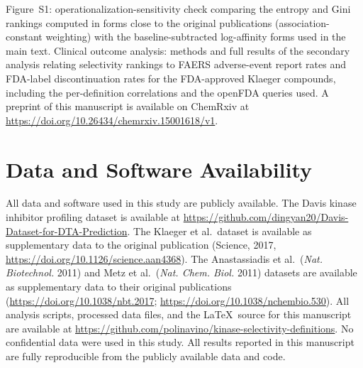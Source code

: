 \documentclass[journal=jcisd8,manuscript=article]{achemso}
\begin{document}
\begin{suppinfo}
Figure~S1: operationalization-sensitivity check comparing the entropy and Gini
rankings computed in forms close to the original publications
(association-constant weighting) with the baseline-subtracted log-affinity forms
used in the main text.
Clinical outcome analysis: methods and full results of the secondary analysis
relating selectivity rankings to FAERS adverse-event report rates and FDA-label
discontinuation rates for the FDA-approved Klaeger compounds, including the
per-definition correlations and the openFDA queries used.
A preprint of this manuscript is available on ChemRxiv at
\url{https://doi.org/10.26434/chemrxiv.15001618/v1}.
\end{suppinfo}

\section*{Data and Software Availability}
All data and software used in this study are publicly available.
The Davis kinase inhibitor profiling dataset is available at
\url{https://github.com/dingyan20/Davis-Dataset-for-DTA-Prediction}.
The Klaeger et al.\ dataset is available as supplementary data to the
original publication (Science, 2017, \url{https://doi.org/10.1126/science.aan4368}).
The Anastassiadis et al.\ (\emph{Nat. Biotechnol.} 2011) and Metz et al.\
(\emph{Nat. Chem. Biol.} 2011) datasets are available as supplementary data to
their original publications
(\url{https://doi.org/10.1038/nbt.2017}; \url{https://doi.org/10.1038/nchembio.530}).
All analysis scripts, processed data files, and the \LaTeX\ source for
this manuscript are available at
\url{https://github.com/polinavino/kinase-selectivity-definitions}.
No confidential data were used in this study.
All results reported in this manuscript are fully reproducible from the
publicly available data and code.


\end{document}
